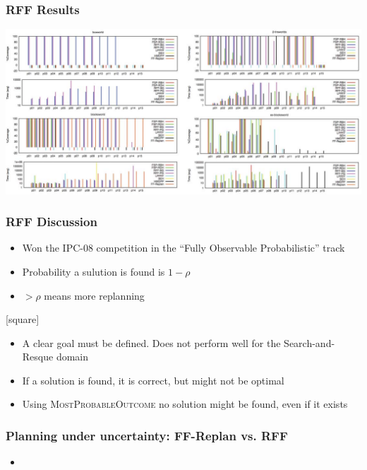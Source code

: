 \documentclass{beamer}
\let\origframetitle=\frametitle
\renewcommand\frametitle[1]{\origframetitle{\textbf{\large{\textrm{#1}}}}}
\begin{document}
\begin{frame}
  \frametitle{RFF Results}

  \includegraphics[width=\textwidth]{images/rff-results.pdf}
\end{frame}

\begin{frame}
  \frametitle{RFF Discussion}

  \begin{itemize}
    \item Won the IPC-08 competition in the ``Fully Observable Probabilistic'' track
    \item Probability a sulution is found is $1 - \rho$
    \item $> \rho$ means more replanning
  \end{itemize}

  [square]
  \begin{itemize}
    \item A clear goal must be defined. Does not perform well for the Search-and-Resque domain
    \item If a solution is found, it is correct, but might not be optimal
    \item Using \textsc{MostProbableOutcome} no solution might be found, even if it exists
  \end{itemize}

\end{frame}

\begin{frame}
  \frametitle{Planning under uncertainty: FF-Replan vs. RFF}

  \begin{itemize}
    \item
  \end{itemize}
\end{frame}
\end{document}
